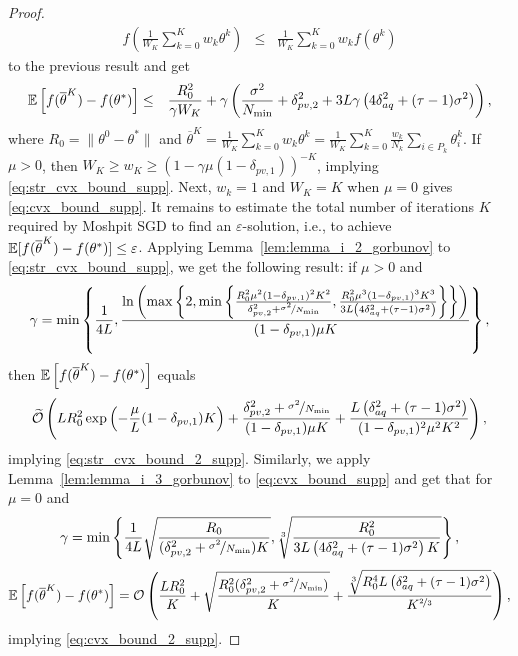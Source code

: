 \begin{proof}
    \begin{eqnarray*}
        f\left(\frac{1}{W_K}\sum\limits_{k=0}^K w_k\theta^k\right) &\le& \frac{1}{W_K}\sum\limits_{k=0}^K w_k f(\theta^k)
    \end{eqnarray*}
    to the previous result and get
    \begin{eqnarray*}
        \mathbb{E}\left[f(\overline{\theta}^K) - f(\theta^*)\right] &\le& \frac{R_0^2}{\gamma W_K} + \gamma\left(\frac{\sigma^2}{N_{\min}} + \delta_{pv,2}^2 + 3L\gamma\left(4\delta_{aq}^2 + (\tau-1)\sigma^2\right)\right),
    \end{eqnarray*}
    where $R_0 = \|\theta^0 - \theta^*\|$ and $\overline{\theta}^K = \frac{1}{W_K}\sum_{k=0}^Kw_k\theta^k = \frac{1}{W_K}\sum_{k=0}^K\frac{w_k}{N_k}\sum_{i\in P_k}\theta_i^k$. If $\mu > 0$, then $W_K \ge w_K \ge (1-\gamma\mu(1-\delta_{pv,1}))^{-K}$, implying \eqref{eq:str_cvx_bound_supp}. Next, $w_k = 1$ and $W_K = K$ when $\mu = 0$ gives \eqref{eq:cvx_bound_supp}. It remains to estimate the total number of iterations $K$ required by Moshpit SGD to find an $\varepsilon$-solution, i.e., to achieve $\mathbb{E}[f(\overline{\theta}^K) - f(\theta^*)] \le \varepsilon$. Applying Lemma~\ref{lem:lemma_i_2_gorbunov} to \eqref{eq:str_cvx_bound_supp}, we get the following result: if $\mu > 0$ and 
    \begin{equation*}
        \gamma = \min\left\{\frac{1}{4L}, \frac{\ln\left(\max\left\{2, \min\left\{\frac{R_0^2\mu^2(1-\delta_{pv,1})^2K^2}{\delta_{pv,2}^2 + \nicefrac{\sigma^2}{N_{\min}} },\frac{R_0^2\mu^3(1-\delta_{pv,1})^3K^3}{3L\left(4\delta_{aq}^2 + (\tau-1)\sigma^2\right)}\right\}\right\}\right)}{(1-\delta_{pv,1})\mu K}\right\},
    \end{equation*}
    then $\mathbb{E}\left[f(\overline{\theta}^K) - f(\theta^*)\right]$ equals
    \begin{equation*}
        \widetilde{{\cal O}}\left(LR_0^2\exp\left(-\frac{\mu}{L}(1-\delta_{pv,1})K\right) + \frac{\delta_{pv,2}^2 + \nicefrac{\sigma^2}{N_{\min}}}{(1-\delta_{pv,1})\mu K} + \frac{L\left(\delta_{aq}^2 + (\tau-1)\sigma^2\right)}{(1-\delta_{pv,1})^2\mu^2 K^2}\right),
    \end{equation*}
    implying \eqref{eq:str_cvx_bound_2_supp}. Similarly, we apply Lemma~\ref{lem:lemma_i_3_gorbunov} to \eqref{eq:cvx_bound_supp} and get that for $\mu = 0$ and 
    \begin{equation*}
        \gamma = \min\left\{\frac{1}{4L} \sqrt{\frac{R_0}{(\delta_{pv,2}^2 + \nicefrac{\sigma^2}{N_{\min}})K}}, \sqrt[3]{\frac{R_0^2}{3L\left(4\delta_{aq}^2 + (\tau-1)\sigma^2\right) K}}\right\},
    \end{equation*}
    \begin{equation*}
        \mathbb{E}\left[f(\overline{\theta}^K) - f(\theta^*)\right] = {\cal O}\left(\frac{LR_0^2}{K} + \sqrt{\frac{R_0^2(\delta_{pv,2}^2 + \nicefrac{\sigma^2}{N_{\min}})}{K}} + \frac{\sqrt[3]{R_0^4L\left(\delta_{aq}^2 + (\tau-1)\sigma^2\right)}}{K^{\nicefrac{2}{3}}}\right),
    \end{equation*}
    implying \eqref{eq:cvx_bound_2_supp}.
\end{proof}








